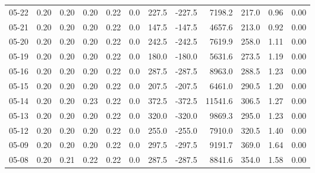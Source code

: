\begin{threeparttable}
{\begin{tabular}{lrrrrrrrrrrr}
  05-22 &          0.20 &          0.20 &          0.20 &        0.22 &                 0.0 &               227.5 &     -227.5 &              7198.2 &            217.0 &            0.96 &                   0.00 \\
  05-21 &          0.20 &          0.20 &          0.20 &        0.22 &                 0.0 &               147.5 &     -147.5 &              4657.6 &            213.0 &            0.92 &                   0.00 \\
  05-20 &          0.20 &          0.20 &          0.20 &        0.22 &                 0.0 &               242.5 &     -242.5 &              7619.9 &            258.0 &            1.11 &                   0.00 \\
  05-19 &          0.20 &          0.20 &          0.20 &        0.22 &                 0.0 &               180.0 &     -180.0 &              5631.6 &            273.5 &            1.19 &                   0.00 \\
  05-16 &          0.20 &          0.20 &          0.20 &        0.22 &                 0.0 &               287.5 &     -287.5 &              8963.0 &            288.5 &            1.23 &                   0.00 \\
  05-15 &          0.20 &          0.20 &          0.20 &        0.22 &                 0.0 &               207.5 &     -207.5 &              6461.0 &            290.5 &            1.20 &                   0.00 \\
  05-14 &          0.20 &          0.20 &          0.23 &        0.22 &                 0.0 &               372.5 &     -372.5 &             11541.6 &            306.5 &            1.27 &                   0.00 \\
  05-13 &          0.20 &          0.20 &          0.20 &        0.22 &                 0.0 &               320.0 &     -320.0 &              9869.3 &            295.0 &            1.23 &                   0.00 \\
  05-12 &          0.20 &          0.20 &          0.20 &        0.22 &                 0.0 &               255.0 &     -255.0 &              7910.0 &            320.5 &            1.40 &                   0.00 \\
  05-09 &          0.20 &          0.20 &          0.20 &        0.22 &                 0.0 &               297.5 &     -297.5 &              9191.7 &            369.0 &            1.64 &                   0.00 \\
  05-08 &          0.20 &          0.21 &          0.22 &        0.22 &                 0.0 &               287.5 &     -287.5 &              8841.6 &            354.0 &            1.58 &                   0.00 \\

\end{tabular}}
\end{threeparttable}
